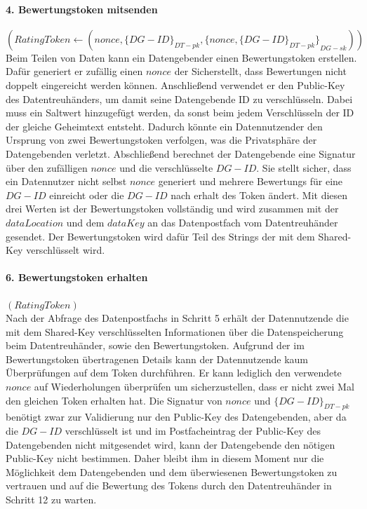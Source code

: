 \documentclass{scrreprt}
\begin{document}
\paragraph{4. Bewertungstoken mitsenden}$(RatingToken \leftarrow (nonce, {\{DG-ID\}}_{DT-pk},{\{nonce, {\{DG-ID\}}_{DT-pk}\}}_{DG-sk}))$\\
Beim Teilen von Daten kann ein Datengebender einen Bewertungstoken erstellen. Dafür generiert er zufällig einen $nonce$ der Sicherstellt, dass Bewertungen nicht doppelt eingereicht werden können. Anschließend verwendet er den Public-Key des Datentreuhänders, um damit seine Datengebende ID zu verschlüsseln. Dabei muss ein Saltwert hinzugefügt werden, da sonst beim jedem Verschlüsseln der ID der gleiche Geheimtext entsteht. Dadurch könnte ein Datennutzender den Ursprung von zwei Bewertungstoken verfolgen, was die Privatsphäre der Datengebenden verletzt. Abschließend berechnet der Datengebende eine Signatur über den zufälligen $nonce$ und die verschlüsselte $DG-ID$. Sie stellt sicher, dass ein Datennutzer nicht selbst $nonce$ generiert und mehrere Bewertungs für eine $DG-ID$ einreicht oder die $DG-ID$ nach erhalt des Token ändert. Mit diesen drei Werten ist der Bewertungstoken vollständig und wird zusammen mit der $dataLocation$ und dem $dataKey$ an das Datenpostfach vom Datentreuhänder gesendet. Der Bewertungstoken wird dafür Teil des Strings der mit dem Shared-Key verschlüsselt wird.

\paragraph{6. Bewertungstoken erhalten}$(RatingToken)$\\
Nach der Abfrage des Datenpostfachs in Schritt 5 erhält der Datennutzende die mit dem Shared-Key verschlüsselten Informationen über die Datenspeicherung beim Datentreuhänder, sowie den Bewertungstoken. Aufgrund der im Bewertungstoken übertragenen Details kann der Datennutzende kaum Überprüfungen auf dem Token durchführen. Er kann lediglich den verwendete $nonce$ auf Wiederholungen überprüfen um sicherzustellen, dass er nicht zwei Mal den gleichen Token erhalten hat. Die Signatur von $nonce$ und ${\{DG-ID\}}_{DT-pk}$ benötigt zwar zur Validierung nur den Public-Key des Datengebenden, aber da die $DG-ID$ verschlüsselt ist und im Postfacheintrag der Public-Key des Datengebenden nicht mitgesendet wird, kann der Datengebende den nötigen Public-Key nicht bestimmen. Daher bleibt ihm in diesem Moment nur die Möglichkeit dem Datengebenden und dem überwiesenen Bewertungstoken zu vertrauen und auf die Bewertung des Tokens durch den Datentreuhänder in Schritt 12 zu warten.
\end{document}
